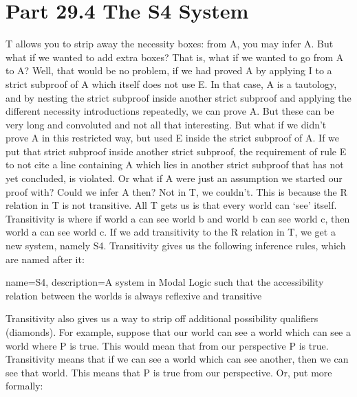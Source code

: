 \section{Part 29.4 The S4 System}
T allows you to strip away the necessity boxes: from \ebox A, you may infer A. But what if we wanted to add extra boxes? That is, what if we wanted to go from \ebox A to \ebox \ebox A? Well, that would be no problem, if we had proved \ebox A by applying \ebox I to a strict subproof of A which itself does not use \ebox E. In that case, A is a tautology, and by nesting the strict subproof inside another strict subproof and applying the different necessity introductions repeatedly, we can prove \ebox \ebox A. But these can be very long and convoluted and not all that interesting. But what if we didn’t prove \ebox A in this restricted way, but used \ebox E inside the strict subproof of A. If we put that strict subproof inside another strict subproof, the requirement of rule \ebox E to not cite a line containing \ebox A which lies in another strict subproof that has not yet concluded, is violated. Or what if \ebox A were just an assumption we started our proof with? Could we infer \ebox \ebox A then? Not in T, we couldn’t. This is because the R relation in T is not transitive. All T gets us is that every world can `see' itself. Transitivity is where if world a can see world b and world b can see world c, then world a can see world c. If we add transitivity to the R relation in T, we get a new system, namely \Gls{S4}. Transitivity gives us the following inference rules, which are named after it:\autocite[168-69]{Sider}

{
name=S4,
description={A system in Modal Logic such that the \gls{accessibility relation} between the \glspl{world} is always \gls{reflexive} and \gls{transitive}}
}


Transitivity also gives us a way to strip off additional possibility qualifiers (diamonds). For example, suppose that our world can see a world which can see a world where P is true. This would mean that from our perspective \ediamond \ediamond P is true. Transitivity means that if we can see a world which can see another, then we can see that world. This means that \ediamond P is true from our perspective. Or, put more formally:

